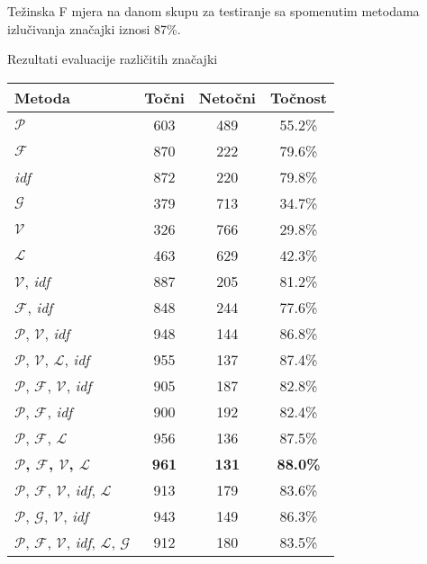 \documentclass[11pt,english]{article}
\makeatletter
\newenvironment{tablehere}
  {\def\@captype{table}}
  {}
\makeatother
\begin{document}
\begin{multicols}{2}
Težinska F mjera na danom skupu za testiranje sa spomenutim metodama
izlučivanja značajki iznosi 87\%.

\begin{tablehere}
\centering%
\caption{Rezultati evaluacije različitih značajki}%
\begin{tabular}{l c c c}
\hline\hline
Metoda & Točni & Netočni & Točnost \\
[0.5ex]
\hline
$\mathcal{P}$ & 603 & 489 & 55.2\% \\
$\mathcal{F}$ & 870 & 222 & 79.6\% \\
\emph{idf} & 872 & 220 & 79.8\% \\
$\mathcal{G}$ & 379 & 713 & 34.7\% \\
$\mathcal{V}$ & 326 & 766 & 29.8\% \\
$\mathcal{L}$ & 463 & 629 & 42.3\% \\
$\mathcal{V}$, \emph{idf} & 887 & 205 & 81.2\% \\
$\mathcal{F}$, \emph{idf} & 848 & 244 & 77.6\% \\
$\mathcal{P}$, $\mathcal{V}$, \emph{idf} & 948 & 144 & 86.8\% \\
$\mathcal{P}$, $\mathcal{V}$, $\mathcal{L}$, \emph{idf} & 955 & 137 & 87.4\% \\
$\mathcal{P}$, $\mathcal{F}$, $\mathcal{V}$, \emph{idf} & 905 & 187 & 82.8\% \\
$\mathcal{P}$, $\mathcal{F}$, \emph{idf} & 900 & 192 & 82.4\% \\
$\mathcal{P}$, $\mathcal{F}$, $\mathcal{L}$ & 956 & 136 & 87.5\% \\
\textbf{$\mathcal{P}$, $\mathcal{F}$, $\mathcal{V}$, $\mathcal{L}$} & \textbf{961} & \textbf{131} & \textbf{88.0\%} \\
$\mathcal{P}$, $\mathcal{F}$, $\mathcal{V}$, \emph{idf}, $\mathcal{L}$ & 913 & 179 & 83.6\% \\
$\mathcal{P}$, $\mathcal{G}$, $\mathcal{V}$, \emph{idf} & 943 & 149 & 86.3\% \\
$\mathcal{P}$, $\mathcal{F}$, $\mathcal{V}$, \emph{idf}, $\mathcal{L}$, $\mathcal{G}$ & 912 & 180 & 83.5\% \\ [1ex]
\hline
\end{tabular}
\label{tbl:eval}%
\end{tablehere}%


\end{multicols}
\end{document}

